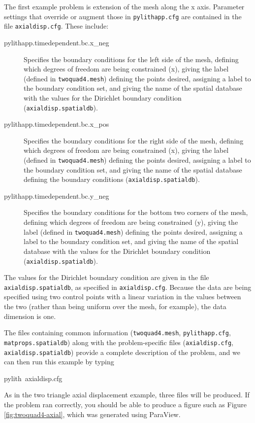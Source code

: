 The first example problem is extension of the mesh along the x axis.
Parameter settings that override or augment those in \texttt{pylithapp.cfg}
are contained in the file \texttt{axialdisp.cfg}. These include:
\begin{description}
\item [{pylithapp.timedependent.bc.x\_neg}] Specifies the boundary conditions
for the left side of the mesh, defining which degrees of freedom are
being constrained (x), giving the label (defined in \texttt{twoquad4.mesh})
defining the points desired, assigning a label to the boundary condition
set, and giving the name of the spatial database with the values for
the Dirichlet boundary condition (\texttt{axialdisp.spatialdb}).
\item [{pylithapp.timedependent.bc.x\_pos}] Specifies the boundary conditions
for the right side of the mesh, defining which degrees of freedom
are being constrained (x), giving the label (defined in \texttt{twoquad4.mesh})
defining the points desired, assigning a label to the boundary condition
set, and giving the name of the spatial database defining the boundary
conditions (\texttt{axialdisp.spatialdb}).
\item [{pylithapp.timedependent.bc.y\_neg}] Specifies the boundary conditions
for the bottom two corners of the mesh, defining which degrees of
freedom are being constrained (y), giving the label (defined in \texttt{twoquad4.mesh})
defining the points desired, assigning a label to the boundary condition
set, and giving the name of the spatial database with the values for
the Dirichlet boundary condition (\texttt{axialdisp.spatialdb}).
\end{description}
The values for the Dirichlet boundary condition are given in the file
\texttt{axialdisp.spatialdb}, as specified in \texttt{axialdisp.cfg}.
Because the data are being specified using two control points with
a linear variation in the values between the two (rather than being
uniform over the mesh, for example), the data dimension is one.

The files containing common information (\texttt{twoquad4.mesh}, \texttt{pylithapp.cfg},
\texttt{matprops.spatialdb}) along with the problem-specific files
(\texttt{axialdisp.cfg}, \texttt{axialdisp.spatialdb}) provide a complete
description of the problem, and we can then run this example by typing
\begin{lyxcode}
pylith~axialdisp.cfg
\end{lyxcode}
As in the two triangle axial displacement example, three files will
be produced. If the problem ran correctly, you should be able to produce
a figure such as Figure \vref{fig:twoquad4-axial}, which was generated
using ParaView.

